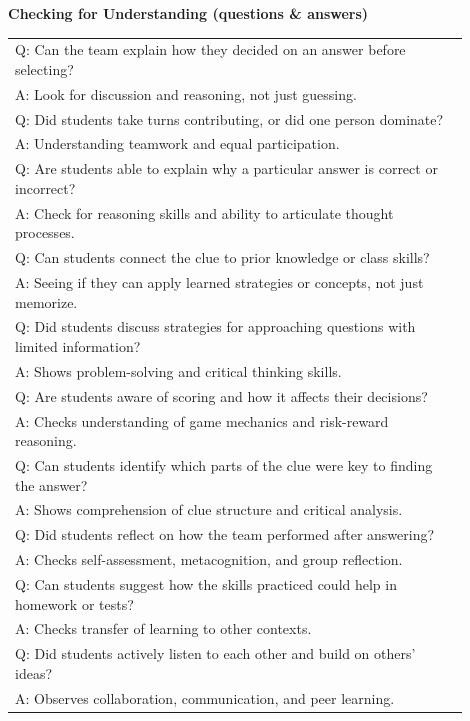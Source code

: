 \documentclass{article}
\begin{document}
\begin{flushleft}
\newpage
\noindent
{\large \textbf{Checking for Understanding (questions \& answers)}} \\
\begin{tabular}{|p{0.9\linewidth}|}
\hline
\hline
Q: Can the team explain how they decided on an answer before selecting? \\
A: Look for discussion and reasoning, not just guessing. \\
\hline
Q: Did students take turns contributing, or did one person dominate? \\
A: Understanding teamwork and equal participation. \\
\hline
Q: Are students able to explain why a particular answer is correct or incorrect? \\
A: Check for reasoning skills and ability to articulate thought processes. \\
\hline
Q: Can students connect the clue to prior knowledge or class skills? \\
A: Seeing if they can apply learned strategies or concepts, not just memorize. \\
\hline
Q: Did students discuss strategies for approaching questions with limited information? \\
A: Shows problem-solving and critical thinking skills. \\
\hline
Q: Are students aware of scoring and how it affects their decisions? \\
A: Checks understanding of game mechanics and risk-reward reasoning. \\
\hline
Q: Can students identify which parts of the clue were key to finding the answer? \\
A: Shows comprehension of clue structure and critical analysis. \\
\hline
Q: Did students reflect on how the team performed after answering? \\
A: Checks self-assessment, metacognition, and group reflection. \\
\hline
Q: Can students suggest how the skills practiced could help in homework or tests? \\
A: Checks transfer of learning to other contexts. \\
\hline
Q: Did students actively listen to each other and build on others’ ideas? \\
A: Observes collaboration, communication, and peer learning. \\
\hline
\end{tabular}
\newpage










\end{flushleft}
\end{document}
